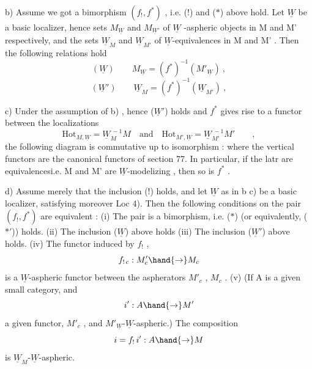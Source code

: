 
b) Assume we got a bimorphism $(f_!,f^*)$ , i.e. (!) and ($*$) above
hold. Let $\underline{W}$ be a basic localizer, hence   sets $M_{\underline{W}}$ and $M_{\underline{W}'}$ of 
$\underline{W}$ -aspheric objects in M and M' respectively, and the sets $\underline{W}_M$ and $\underline{W}_{M'}$
of $\underline{W}$-equivalences in M and M' . Then the following relations hold
\[ (\underline{W}) \qquad M_{\underline{W}} = (f^*)^{-1}(M'_{\underline{W}}) \ , \]
\[ (\underline{W}') \qquad \underline{W}_M = (f^*)^{-1}(\underline{W}_{M'}) \ , \]

c) Under the assumption of b) , hence ($\underline{W}'$) holds and $f^*$ gives
rise to a functor \inserted[typed]{$\hand{\overline{\textcolor{black}{f^*}}}$} between the localizations 
\[ \mathrm{Hot}_{M,\underline{W}} = \underline{W}_M^{\ -1}M \quad\text{and}\quad \mathrm{Hot}_{M',\underline{W}} = \underline{W}_{M'}^{\ -1}M' \qquad , \]
the following diagram is commutative up to   isomorphism :
where the vertical functors are the canonical functors of section 77.
In particular, if the lat\hand{\uline{\textcolor{black}{te}}}r are equivalences\hand{(}i.e. M and M' are
$\underline{W}$-modelizing\hand{)} , then so is $f^*$ .

d) Assume merely that the inclusion (!) holds, and let $\underline{W}$ as in b\hand{)}
c) be a basic localizer, satisfying moreover Loc 4). Then the 
 following conditions on the pair $(f_!,f^*)$ are equivalent :
(i) The pair is a bimorphism, i.e. ($*$) (or equivalently, ($*'$))
holds.
(ii) The inclusion  ($\underline{W}$) above holds\hand{,} 
(iii) The inclusion  ($\underline{W}'$) above holds.
(iv) The functor induced by $f_!$ ,
\[ f_{!\,c} : M'_c \hand{\to} M_c \]
is a $\underline{W}$-aspheric functor between the aspherators $M'_c$ , $M_c$ .
(v) (If A is a given small category, and 
\[ i' : A \hand{\to} M' \]
a given functor, \hand{\uline{\textcolor{black}{factoring}}} \hand{\uline{\textcolor{black}{through}}} $M'_c$ , and $M'_{\underline{W}}$-$\underline{W}$-aspheric.) The
composition
\[ i = f_!\, i' : A \hand{\to} M \]
is $\underline{W}_M$-$\underline{W}$-aspheric.

